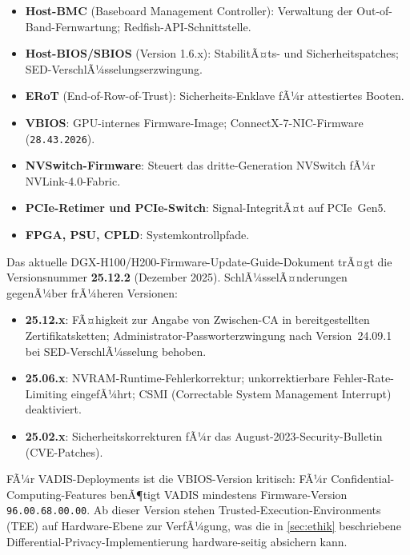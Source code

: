 ﻿\documentclass[12pt,a4paper]{article}
\begin{document}
\begin{itemize}[leftmargin=1.4em, itemsep=1pt]
  \item \textbf{Host-BMC} (Baseboard Management Controller):
        Verwaltung der Out-of-Band-Fern\-wartung; Redfish-API-Schnittstelle.
  \item \textbf{Host-BIOS/SBIOS} (Version 1.6.x): StabilitÃ¤ts-
        und Sicherheitspatches; SED-Ver\-schlÃ¼sselungs\-erzwingung.
  \item \textbf{ERoT} (End-of-Row-of-Trust): Sicherheits-Enklave
        fÃ¼r attestiertes Booten.
  \item \textbf{VBIOS}: GPU-internes Firmware-Image;
        ConnectX-7-NIC-Firmware (\texttt{28.43.2026}).
  \item \textbf{NVSwitch-Firmware}: Steuert das dritte-Generation
        NVSwitch fÃ¼r NVLink-4.0-Fabric.
  \item \textbf{PCIe-Retimer und PCIe-Switch}: Signal-IntegritÃ¤t
        auf PCIe~Gen5.
  \item \textbf{FPGA, PSU, CPLD}: Systemkontrollpfade.
\end{itemize}

\noindent Das aktuelle DGX-H100/H200-Firmware-Update-Guide-Dokument
trÃ¤gt die Versionsnummer \textbf{25.12.2} (Dezember 2025).
SchlÃ¼sselÃ¤nderungen gegenÃ¼ber frÃ¼heren Versionen:

\begin{itemize}[leftmargin=1.4em, itemsep=1pt]
  \item \textbf{25.12.x}: FÃ¤higkeit zur Angabe von Zwischen-CA in
        bereitgestellten Zertifikatsketten; Administrator-Passworterzwingung
        nach Version~24.09.1 bei SED-VerschlÃ¼sselung behoben.
  \item \textbf{25.06.x}: NVRAM-Runtime-Fehlerkorrektur;
        unkorrektierbare Fehler-Rate-Limiting eingefÃ¼hrt;
        CSMI (Correctable System Management Interrupt) deaktiviert.
  \item \textbf{25.02.x}: Sicherheitskorrekturen fÃ¼r das
        August-2023-Security-Bulletin (CVE-Patches).
\end{itemize}

\noindent FÃ¼r VADIS-Deployments ist die VBIOS-Version kritisch:
FÃ¼r Confidential-Computing-Features benÃ¶tigt VADIS mindestens
Firmware-Version \texttt{96.00.68.00.00}. Ab dieser Version
stehen Trusted-Execution-Environments (TEE) auf Hardware-Ebene
zur VerfÃ¼gung, was die in \cref{sec:ethik} beschriebene
Differential-Privacy-Implementierung hardware-seitig absichern kann.
\end{document}
